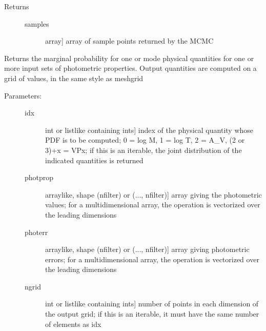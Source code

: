 \documentclass[letterpaper,10pt,english]{sphinxmanual}
\begin{document}
\begin{fulllineitems}
\begin{fulllineitems}
\begin{description}
\begin{description}
\end{description}

\item[{Returns}] \leavevmode\begin{description}
\item[{samples}] \leavevmode{[}array{]}
array of sample points returned by the MCMC

\end{description}

\end{description}

\end{fulllineitems}


\begin{fulllineitems}
\label{cluster_slug:slugpy.cluster_slug.cluster_slug.mpdf}
Returns the marginal probability for one or mode physical
quantities for one or more input sets of photometric
properties. Output quantities are computed on a grid of
values, in the same style as meshgrid
\begin{description}
\item[{Parameters:}] \leavevmode\begin{description}
\item[{idx}] \leavevmode{[}int or listlike containing ints{]}
index of the physical quantity whose PDF is to be
computed; 0 = log M, 1 = log T, 2 = A\_V, (2 or 3)+x = VPx; 
if this is an iterable, the joint distribution of the indicated
quantities is returned

\item[{photprop}] \leavevmode{[}arraylike, shape (nfilter) or (..., nfilter){]}
array giving the photometric values; for a
multidimensional array, the operation is vectorized over
the leading dimensions

\item[{photerr}] \leavevmode{[}arraylike, shape (nfilter) or (..., nfilter){]}
array giving photometric errors; for a multidimensional
array, the operation is vectorized over the leading
dimensions

\item[{ngrid}] \leavevmode{[}int or listlike containing ints{]}
number of points in each dimension of the output grid;
if this is an iterable, it must have the same number of
elements as idx


\end{description}
\end{description}
\end{fulllineitems}
\end{fulllineitems}
\end{document}
